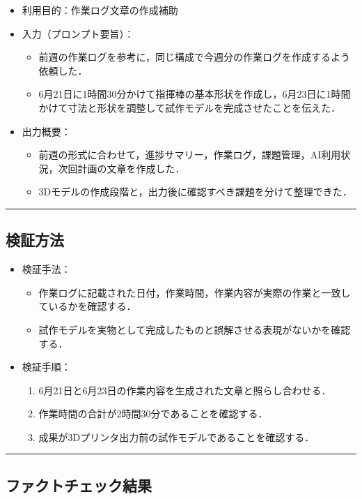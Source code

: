 \documentclass[uplatex,dvipdfmx,a4paper,11pt]{jsarticle}
\newcommand{\sectionrule}{\par\medskip\noindent\rule{\linewidth}{0.6pt}\par\medskip}
\begin{document}
\begin{itemize}
  \item 利用目的：作業ログ文章の作成補助
  \item 入力（プロンプト要旨）：
    \begin{itemize}
      \item 前週の作業ログを参考に，同じ構成で今週分の作業ログを作成するよう依頼した．
      \item 6月21日に1時間30分かけて指揮棒の基本形状を作成し，6月23日に1時間かけて寸法と形状を調整して試作モデルを完成させたことを伝えた．
    \end{itemize}
  \item 出力概要：
    \begin{itemize}
      \item 前週の形式に合わせて，進捗サマリー，作業ログ，課題管理，AI利用状況，次回計画の文章を作成した．
      \item 3Dモデルの作成段階と，出力後に確認すべき課題を分けて整理できた．
    \end{itemize}
\end{itemize}

\sectionrule

\subsection{検証方法}

\begin{itemize}
  \item 検証手法：
    \begin{itemize}
      \item 作業ログに記載された日付，作業時間，作業内容が実際の作業と一致しているかを確認する．
      \item 試作モデルを実物として完成したものと誤解させる表現がないかを確認する．
    \end{itemize}
  \item 検証手順：
    \begin{enumerate}
      \item 6月21日と6月23日の作業内容を生成された文章と照らし合わせる．
      \item 作業時間の合計が2時間30分であることを確認する．
      \item 成果が3Dプリンタ出力前の試作モデルであることを確認する．
    \end{enumerate}
\end{itemize}

\sectionrule

\subsection{ファクトチェック結果}
\end{document}
